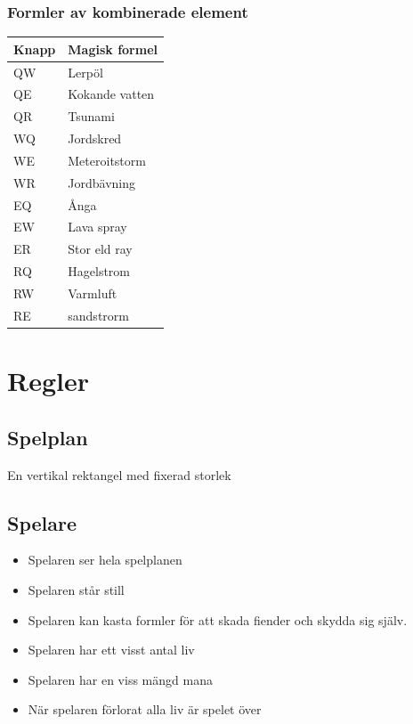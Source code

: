 \documentclass[12pt]{TDP005mall}
\begin{document}
\subsubsection{Formler av kombinerade element}
\begin{table}[H]
\begin{tabular}{|l|l|}
\hline
\textbf{Knapp} & \textbf{Magisk formel} \\ \hline
QW             & Lerpöl                 \\ \hline
QE             & Kokande vatten         \\ \hline
QR             & Tsunami                \\ \hline
WQ             & Jordskred              \\ \hline
WE             & Meteroitstorm          \\ \hline
WR             & Jordbävning            \\ \hline
EQ             & Ånga                   \\ \hline
EW             & Lava spray             \\ \hline
ER             & Stor eld ray           \\ \hline
RQ             & Hagelstrom             \\ \hline
RW             & Varmluft               \\ \hline
RE             & sandstrorm             \\ \hline
\end{tabular}
\end{table}

\clearpage


\section{Regler}
\subsection{Spelplan}
En vertikal rektangel med fixerad storlek
\subsection{Spelare}
\begin{itemize}
\item Spelaren ser hela spelplanen
\item Spelaren står still
\item Spelaren kan kasta formler för att skada fiender och skydda sig själv.
\item Spelaren har ett visst antal liv
\item Spelaren har en viss mängd mana
\item När spelaren förlorat alla liv är spelet över
\end{itemize}
\end{document}
